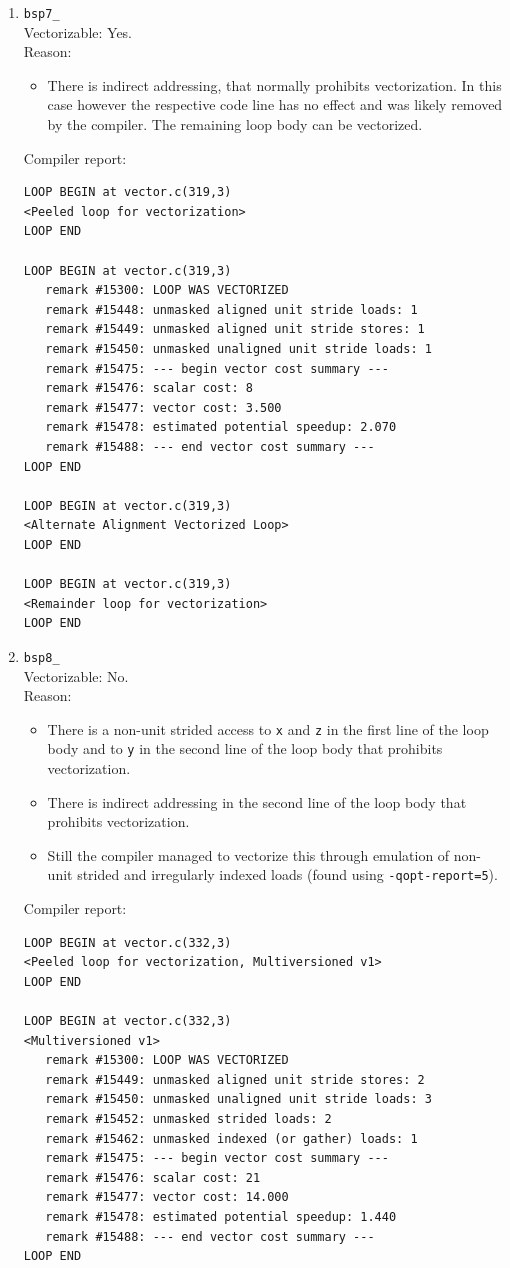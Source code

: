\documentclass[11pt]{article}
\begin{document}
\begin{enumerate}
\item \texttt{bsp7\_}\\
Vectorizable: Yes.\\
Reason:
\begin{itemize}
\item There is indirect addressing, that normally prohibits vectorization. In this case however the respective code line has no effect and was likely removed by the compiler. The remaining loop body can be vectorized.
\end{itemize}
Compiler report:
\begin{lstlisting}
LOOP BEGIN at vector.c(319,3)
<Peeled loop for vectorization>
LOOP END

LOOP BEGIN at vector.c(319,3)
   remark #15300: LOOP WAS VECTORIZED
   remark #15448: unmasked aligned unit stride loads: 1 
   remark #15449: unmasked aligned unit stride stores: 1 
   remark #15450: unmasked unaligned unit stride loads: 1 
   remark #15475: --- begin vector cost summary ---
   remark #15476: scalar cost: 8 
   remark #15477: vector cost: 3.500 
   remark #15478: estimated potential speedup: 2.070 
   remark #15488: --- end vector cost summary ---
LOOP END

LOOP BEGIN at vector.c(319,3)
<Alternate Alignment Vectorized Loop>
LOOP END

LOOP BEGIN at vector.c(319,3)
<Remainder loop for vectorization>
LOOP END
\end{lstlisting}

\item \texttt{bsp8\_}\\
Vectorizable: No.\\
Reason:
\begin{itemize}
\item There is a non-unit strided access to \texttt{x} and \texttt{z} in the first line of the loop body and to \texttt{y} in the second line of the loop body that prohibits vectorization.
\item There is indirect addressing in the second line of the loop body that prohibits vectorization.
\item Still the compiler managed to vectorize this through emulation of non-unit strided and irregularly indexed loads (found using \texttt{-qopt-report=5}).
\end{itemize}
Compiler report:
\begin{lstlisting}
LOOP BEGIN at vector.c(332,3)
<Peeled loop for vectorization, Multiversioned v1>
LOOP END

LOOP BEGIN at vector.c(332,3)
<Multiversioned v1>
   remark #15300: LOOP WAS VECTORIZED
   remark #15449: unmasked aligned unit stride stores: 2 
   remark #15450: unmasked unaligned unit stride loads: 3 
   remark #15452: unmasked strided loads: 2 
   remark #15462: unmasked indexed (or gather) loads: 1 
   remark #15475: --- begin vector cost summary ---
   remark #15476: scalar cost: 21 
   remark #15477: vector cost: 14.000 
   remark #15478: estimated potential speedup: 1.440 
   remark #15488: --- end vector cost summary ---
LOOP END


\end{lstlisting}
\end{enumerate}
\end{document}
